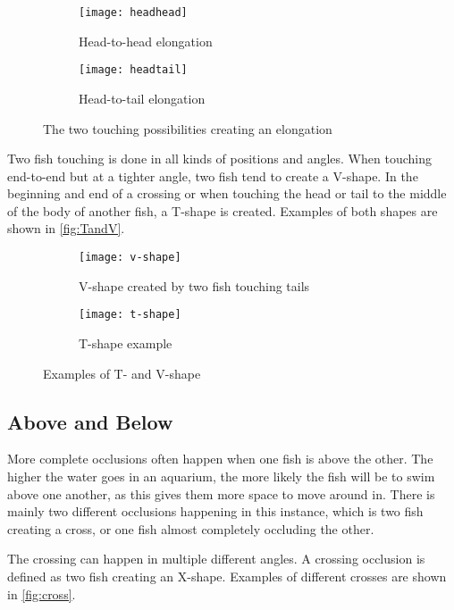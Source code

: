 \begin{figure}[H]
	\centering
	\begin{subfigure}[b]{0.47\textwidth}
		\texttt{[image: headhead]}
		\caption{Head-to-head elongation}
		\label{fig:headhead}
	\end{subfigure}
	\begin{subfigure}[b]{0.47\textwidth}
		\texttt{[image: headtail]}
		\caption{Head-to-tail elongation}
		\label{fig:headtail}
	\end{subfigure}
\caption{The two touching possibilities creating an elongation}
\label{fig:elongation}
\end{figure}

Two fish touching is done in all kinds of positions and angles. When touching end-to-end but at a tighter angle, two fish tend to create a V-shape. In the beginning and end of a crossing or when touching the head or tail to the middle of the body of another fish, a T-shape is created. Examples of both shapes are shown in \autoref{fig:TandV}.

\begin{figure}[H]
	\centering
	\begin{subfigure}[b]{0.47\textwidth}
		\texttt{[image: v-shape]}
		\caption{V-shape created by two fish touching tails}
		\label{fig:v-shape}
	\end{subfigure}
	\begin{subfigure}[b]{0.47\textwidth}
		\texttt{[image: t-shape]}
		\caption{T-shape example}
		\label{fig:t-shape}
	\end{subfigure}
\caption{Examples of T- and V-shape}
\label{fig:TandV}
\end{figure}

\subsection{Above and Below}
More complete occlusions often happen when one fish is above the other. The higher the water goes in an aquarium, the more likely the fish will be to swim above one another, as this gives them more space to move around in. There is mainly two different occlusions happening in this instance, which is two fish creating a cross, or one fish almost completely occluding the other.

The crossing can happen in multiple different angles. A crossing occlusion is defined as two fish creating an X-shape. Examples of different crosses are shown in \autoref{fig:cross}. 

